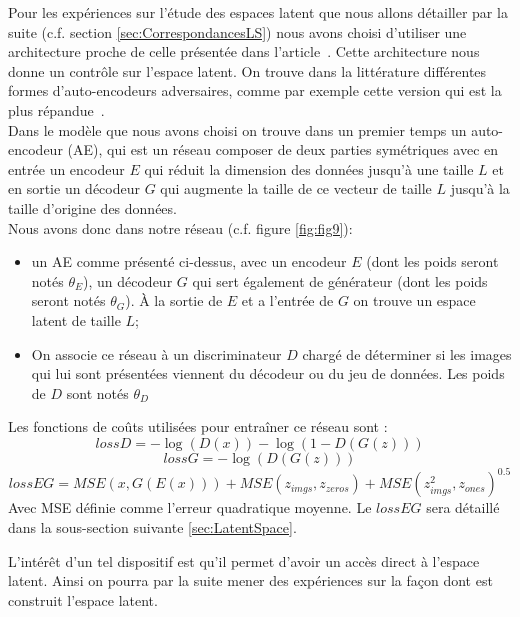 \documentclass[11pt,francais]{article}
\begin{document}
Pour les expériences sur l'étude des espaces latent que nous allons détailler par la suite (c.f. section \ref{sec:CorrespondancesLS}) nous avons choisi d'utiliser une architecture proche de celle présentée dans l'article~\cite{GADAE}. Cette architecture nous donne un contrôle sur l'espace latent.
On trouve dans la littérature différentes formes d'auto-encodeurs adversaires, comme par exemple cette version qui est la plus répandue~\cite{makhzani2015adversarial}.\\
Dans le modèle que nous avons choisi on trouve dans un premier temps un auto-encodeur (AE), qui est un réseau composer de deux parties symétriques avec en entrée un encodeur \(E\) qui réduit la dimension des données jusqu'à une taille \(L\) et en sortie un décodeur \(G\) qui augmente la taille de ce vecteur de taille \(L\) jusqu'à la taille d'origine des données. \\
Nous avons donc dans notre réseau (c.f. figure \ref{fig:fig9}):
\begin{itemize}
  \item un AE comme présenté ci-dessus, avec un encodeur \(E\) (dont les poids seront notés \(\theta_E\)), un décodeur \(G\) qui sert également de générateur (dont les poids seront notés \(\theta_G\)). À la sortie de \(E\) et a l'entrée de \(G\) on trouve un espace latent de taille \(L\);
  \item On associe ce réseau à un discriminateur \(D\) chargé de déterminer si les images qui lui sont présentées viennent du décodeur ou du jeu de données. Les poids de \(D\) sont notés \(\theta_D\) 
\end{itemize}
Les fonctions de coûts utilisées pour entraîner ce réseau sont :
\[
lossD = -\log(D(x)) - \log(1-D(G(z)))
\]
\[
lossG = -\log(D(G(z)))
\]
\[
lossEG = MSE(x, G(E(x))) + MSE(z_{imgs}, z_{zeros}) + MSE(z_{imgs}^2, z_{ones})^{0.5}
\]
Avec MSE définie comme l'erreur quadratique moyenne.
Le \(lossEG\) sera détaillé dans la sous-section suivante \ref{sec:LatentSpace}.

L'intérêt d'un tel dispositif est qu'il permet d'avoir un accès direct à l'espace latent. Ainsi on pourra par la suite mener des expériences sur la façon dont est construit l'espace latent.
\end{document}
